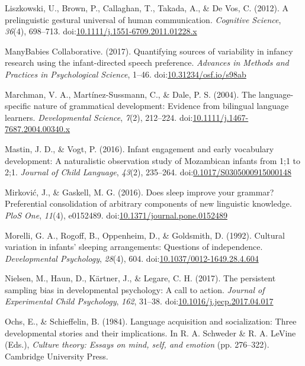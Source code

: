 \documentclass[floatsintext,man]{apa6}
\theoremstyle{definition}
\theoremstyle{definition}
\theoremstyle{definition}
\theoremstyle{remark}
\begin{document}
\hypertarget{ref-liszkowski2012prelinguistic}{}
Liszkowski, U., Brown, P., Callaghan, T., Takada, A., \& De Vos, C.
(2012). A prelinguistic gestural universal of human communication.
\emph{Cognitive Science}, \emph{36}(4), 698--713.
doi:\href{https://doi.org/10.1111/j.1551-6709.2011.01228.x}{10.1111/j.1551-6709.2011.01228.x}

\hypertarget{ref-manybabies2017}{}
ManyBabies Collaborative. (2017). Quantifying sources of variability in
infancy research using the infant-directed speech preference.
\emph{Advances in Methods and Practices in Psychological Science},
1--46.
doi:\href{https://doi.org/10.31234/osf.io/s98ab}{10.31234/osf.io/s98ab}

\hypertarget{ref-marchman2004language}{}
Marchman, V. A., Martínez-Sussmann, C., \& Dale, P. S. (2004). The
language-specific nature of grammatical development: Evidence from
bilingual language learners. \emph{Developmental Science}, \emph{7}(2),
212--224.
doi:\href{https://doi.org/10.1111/j.1467-7687.2004.00340.x}{10.1111/j.1467-7687.2004.00340.x}

\hypertarget{ref-mastin2016infant}{}
Mastin, J. D., \& Vogt, P. (2016). Infant engagement and early
vocabulary development: A naturalistic observation study of Mozambican
infants from 1;1 to 2;1. \emph{Journal of Child Language}, \emph{43}(2),
235--264.
doi:\href{https://doi.org/0.1017/S0305000915000148}{0.1017/S0305000915000148}

\hypertarget{ref-mirkovic2016does}{}
Mirković, J., \& Gaskell, M. G. (2016). Does sleep improve your grammar?
Preferential consolidation of arbitrary components of new linguistic
knowledge. \emph{PloS One}, \emph{11}(4), e0152489.
doi:\href{https://doi.org/10.1371/journal.pone.0152489}{10.1371/journal.pone.0152489}

\hypertarget{ref-morelli1992cultural}{}
Morelli, G. A., Rogoff, B., Oppenheim, D., \& Goldsmith, D. (1992).
Cultural variation in infants' sleeping arrangements: Questions of
independence. \emph{Developmental Psychology}, \emph{28}(4), 604.
doi:\href{https://doi.org/10.1037/0012-1649.28.4.604}{10.1037/0012-1649.28.4.604}

\hypertarget{ref-nielsen2017persistent}{}
Nielsen, M., Haun, D., Kärtner, J., \& Legare, C. H. (2017). The
persistent sampling bias in developmental psychology: A call to action.
\emph{Journal of Experimental Child Psychology}, \emph{162}, 31--38.
doi:\href{https://doi.org/10.1016/j.jecp.2017.04.017}{10.1016/j.jecp.2017.04.017}

\hypertarget{ref-ochs1984language}{}
Ochs, E., \& Schieffelin, B. (1984). Language acquisition and
socialization: Three developmental stories and their implications. In R.
A. Schweder \& R. A. LeVine (Eds.), \emph{Culture theory: Essays on
mind, self, and emotion} (pp. 276--322). Cambridge University Press.
\end{document}
